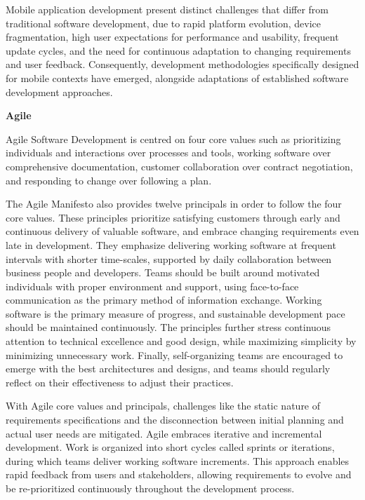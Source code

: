 Mobile application development present distinct challenges that differ from traditional software development, due to rapid platform evolution, device fragmentation, high user expectations for performance and usability, frequent update cycles, and the need for continuous adaptation to changing requirements and user feedback. Consequently, development methodologies specifically designed for mobile contexts have emerged, alongside adaptations of established software development approaches.

\textbf{Agile}

Agile Software Development is centred on four core values such as prioritizing individuals and interactions over processes and tools, working software over comprehensive documentation, customer collaboration over contract negotiation, and responding to change over following a plan\cite{agile-manifesto}.

The Agile Manifesto\cite{originalAgileMani} also provides twelve principals in order to follow the four core values. These principles prioritize satisfying customers through early and continuous delivery of valuable software, and embrace changing requirements even late in development. They emphasize delivering working software at frequent intervals with shorter time-scales, supported by daily collaboration between business people and developers. Teams should be built around motivated individuals with proper environment and support, using face-to-face communication as the primary method of information exchange. Working software is the primary measure of progress, and sustainable development pace should be maintained continuously. The principles further stress continuous attention to technical excellence and good design, while maximizing simplicity by minimizing unnecessary work. Finally, self-organizing teams are encouraged to emerge with the best architectures and designs, and teams should regularly reflect on their effectiveness to adjust their practices.\cite{agile-manifesto} 

With Agile core values and principals, challenges like the static nature of requirements specifications and the disconnection between initial planning and actual user needs are mitigated. Agile embraces iterative and incremental development. Work is organized into short cycles called sprints or iterations, during which teams deliver working software increments. This approach enables rapid feedback from users and stakeholders, allowing requirements to evolve and be re-prioritized continuously throughout the development process.\cite{agile-manifesto} 

